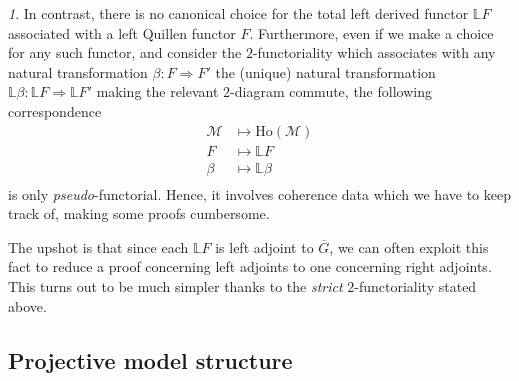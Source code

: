 \documentclass[reqno]{amsart}
\theoremstyle{plain}
\theoremstyle{definition}
\theoremstyle{remark}
\newtheorem{paragr}[subsubsection]{} %
\newcommand{\M}{\mathcal{M}}
\newcommand{\LL}{\mathbb{L}} %
\newcommand{\Loc}[1]{\mathrm{Ho}(#1)} %
\newcommand{\GZ}[1]{\overline{#1}} %
\newcommand{\nbd}{\nobreakdash} %
\begin{document}
\begin{paragr}
  In contrast, there is no canonical choice for the total left derived functor $\LL F$ associated with
  a left Quillen functor $F$. Furthermore, even if we make a choice for any such
  functor, and consider the $2$\nbd-functoriality which associates with
  any natural transformation $\beta \colon F \Rightarrow F'$ the (unique) natural
  transformation $\LL \beta \colon \LL F \Rightarrow \LL F'$ making
  the relevant $2$\nbd-diagram commute, the
  following correspondence
  \[
  \begin{aligned}
    \M &\longmapsto\Loc{\M}\\
    F &\longmapsto\LL F\\
    \beta &\longmapsto \LL \beta\\
  \end{aligned}
 \] 
  is only \emph{pseudo}-functorial. Hence, it involves coherence 
  data which we have to keep track of, making some proofs cumbersome.

  The upshot is that since each $\LL F$ is left adjoint to $\GZ{G}$,
  we can often exploit this fact to reduce a proof concerning left
  adjoints to one concerning right adjoints.
  This turns out to be much simpler thanks to the \emph{strict}
  $2$\nbd-functoriality stated above.
    \end{paragr}
\subsection{Projective model structure}\label{projms}
\end{document}
